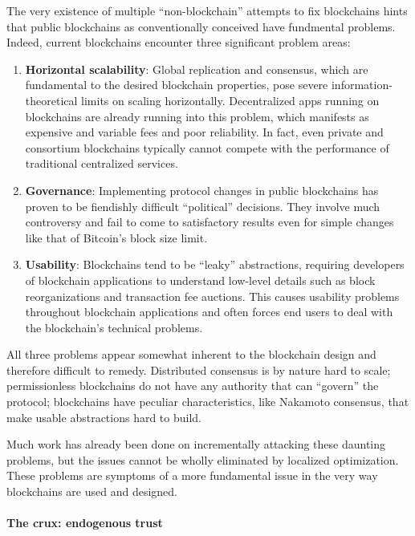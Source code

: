 \documentclass[]{article}
\providecommand{\tightlist}{%
  \setlength{\itemsep}{0pt}\setlength{\parskip}{0pt}}
\let\oldparagraph\paragraph
\renewcommand{\paragraph}[1]{\oldparagraph{#1}\mbox{}}
\begin{document}
The very existence of multiple ``non-blockchain'' attempts to fix
blockchains hints that public blockchains as conventionally conceived
have fundmental problems. Indeed, current blockchains encounter three
significant problem areas:

\begin{enumerate}
\def\labelenumi{\arabic{enumi}.}
\tightlist
\item
  \textbf{Horizontal scalability}: Global replication and consensus,
  which are fundamental to the desired blockchain properties, pose
  severe information-theoretical limits on scaling horizontally.
  Decentralized apps running on blockchains are already running into
  this problem, which manifests as expensive and variable fees and poor
  reliability. In fact, even private and consortium blockchains
  typically cannot compete with the performance of traditional
  centralized services.
\item
  \textbf{Governance}: Implementing protocol changes in public
  blockchains has proven to be fiendishly difficult ``political''
  decisions. They involve much controversy and fail to come to
  satisfactory results even for simple changes like that of Bitcoin's
  block size limit.
\item
  \textbf{Usability}: Blockchains tend to be ``leaky'' abstractions,
  requiring developers of blockchain applications to understand
  low-level details such as block reorganizations and transaction fee
  auctions. This causes usability problems throughout blockchain
  applications and often forces end users to deal with the blockchain's
  technical problems.
\end{enumerate}

All three problems appear somewhat inherent to the blockchain design and
therefore difficult to remedy. Distributed consensus is by nature hard
to scale; permissionless blockchains do not have any authority that can
``govern'' the protocol; blockchains have peculiar characteristics, like
Nakamoto consensus, that make usable abstractions hard to build.

Much work has already been done on incrementally attacking these
daunting problems, but the issues cannot be wholly eliminated by
localized optimization. These problems are symptoms of a more
fundamental issue in the very way blockchains are used and designed.

\hypertarget{the-crux-endogenous-trust}{%
\paragraph{The crux: endogenous trust}\label{the-crux-endogenous-trust}}
\end{document}
